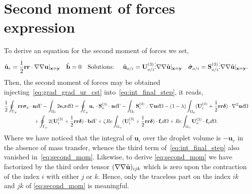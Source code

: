 \section{Second moment of forces expression}
\label{ap:second_mom}
To derive an equation for the second moment of forces we set,
\begin{align}
    \label{eq:grad_grad_ur_cst}
    \hat{\textbf{u}}_r =\frac{1}{2}\textbf{rr}\cdot  \grad\grad \textbf{u}|_{\textbf{x}=\textbf{y}}
    &&
    \hat{\textbf{b}} = 0 &&\text{Solutions: }
    &&
    \hat{\textbf{u}}_{o/i} = \textbf{U}_{o/i}^{(3)} \vdots \grad\grad\hat{\textbf{u}}|_{\textbf{x}=\textbf{y}}
    &&
    \hat{\bm\sigma}_{o/i} = \textbf{S}_{o/i}^{(3)} \vdots \grad\grad\hat{\textbf{u}}|_{\textbf{x}=\textbf{y}}.
\end{align}
Then, the second moment of forces may be obtained injecting~\ref{eq:grad_grad_ur_cst} into~\ref{eq:int_final_step}, it reads,
\begin{multline}
    \frac{1}{2}\intS[p]{\textbf{rr}  \bm\sigma_{o}\cdot \textbf{n}}
    - \intO[i]{2\textbf{e}_i \textbf{r}}
    =
    \intS[p]{\textbf{u}_{r}\cdot \textbf{S}^{(3)}_{o}\cdot \textbf{n}}
    - \intO[i]{\textbf{S}_i^{(3)} :\grad\textbf{u}}
    - (1-\lambda) \intO[p]{( \textbf{U}_{i}^{(3)} + \frac{1}{2} \textbf{rr}\bm\delta ) \cdot \grad^2 \textbf{u} }\\
    + \intS[p]{2( \textbf{U}_{i}^{(3)} + \frac{1}{2} \textbf{rr}\bm\delta ) \cdot  \textbf{b}}
    + \zeta Re \intO{( \textbf{U}_{i}^{(3)} + \frac{1}{2} \textbf{rr}\bm\delta )\cdot \textbf{f}_{i}}
    + Re\intO[o]{\textbf{U}_{o}^{(3)}\cdot \textbf{f}_{o}}.
    \label{eq:second_mom}
\end{multline}
Where we have noticed that the integral of $\textbf{u}_i$ over the droplet volume is $-\textbf{u}_r$ in the absence of mass transfer, whence the third term of~\ref{eq:int_final_step} also vanished in~\ref{eq:second_mom}.
Likewise, to derive \ref{eq:second_mom} we have factorized by the third order tensor $(\mathbf{\nabla}\mathbf{\nabla} \hat{\textbf{u}})_{ijk}$ which is zero upon the contraction of the index $i$ with either $j$ or $k$.
Hence, only the traceless part on the index $ik$ and $jk$ of \ref{eq:second_mom} is meaningful.

